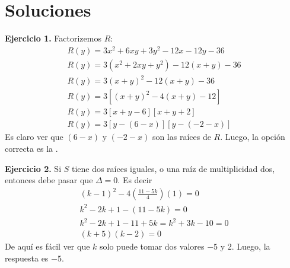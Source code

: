 \section*{\large Soluciones}
{
    \textbf{Ejercicio 1.}
        Factorizemos $R$:
        \begin{gather*}
            R(y) = 3x^2 + 6xy + 3y^2 - 12x - 12y - 36 \\
            R(y) = 3(x^2 + 2xy + y^2) - 12(x + y) - 36 \\
            R(y) = 3(x + y)^2 - 12(x + y) - 36 \\
            R(y) = 3\left[ (x + y)^2 - 4(x + y) - 12 \right] \\
            R(y) = 3\left[ x + y - 6 \right]\left[ x + y + 2 \right] \\
            R(y) = 3\left[ y - (6 - x) \right]\left[ y - (- 2 - x) \right]
        \end{gather*}
        Es claro ver que $(6 - x)$ y $(-2 - x)$ son las raíces de $R$. Luego, la opción correcta es la .

    \textbf{Ejercicio 2.}
        Si $S$ tiene dos raíces iguales, o una raíz de multiplicidad dos, entonces debe pasar que $\Delta = 0$. Es decir
        \begin{gather*}
            (k - 1)^2 - 4\left( \frac{11 - 5k}{4} \right)(1) = 0\\
            k^2 - 2k + 1 - (11 - 5k) = 0\\
            k^2 - 2k + 1 - 11 + 5k = k^2 + 3k - 10 = 0\\
            (k + 5)(k - 2) = 0
        \end{gather*}
        De aquí es fácil ver que $k$ solo puede tomar dos valores $-5$ y 2. Luego, la respuesta es $\boxed{-5}$.

}\label{sec:large-soluciones}\label{sec:soluciones}
